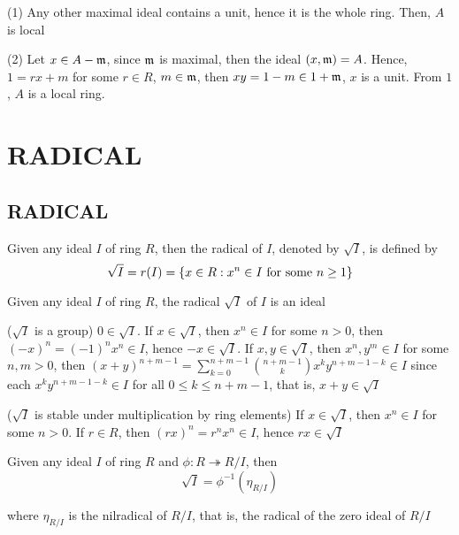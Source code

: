 \begin{longproof}
	(1) Any other maximal ideal contains a unit, hence it is the whole ring. Then, $A$ is local
	
	(2) Let $x \in A - \mathfrak{m}$, since $\mathfrak{m}$ is maximal, then the ideal $(x, \mathfrak{m}) = A$. Hence, $1 = rx + m$ for some $r \in R$, $m \in \mathfrak{m}$, then $xy = 1 - m \in 1 + \mathfrak{m}$, $x$ is a unit. From $1$, $A$ is a local ring. 
\end{longproof}

\section{RADICAL}

\subsection{RADICAL}

\begin{definition}[radical]
	Given any ideal $I$ of ring $R$, then the radical of $I$, denoted by $\sqrt{I}$, is defined by
	$$
		\sqrt{I} = r(I) = \{x \in R: x^n \in I \text{ for some } n \geq 1\}
	$$
\end{definition}

\begin{proposition}
	Given any ideal $I$ of ring $R$, the radical $\sqrt{I}$ of $I$ is an ideal
\end{proposition}

\begin{longproof}
	($\sqrt{I}$ is a group) $0 \in \sqrt{I}$. If $x \in \sqrt{I}$, then $x^n \in I$ for some $n > 0$, then $(-x)^n = (-1)^n x^n \in I$, hence $-x \in \sqrt{I}$. If $x, y \in \sqrt{I}$, then $x^n, y^m \in I$ for some $n, m > 0$, then $(x + y)^{n +m - 1} = \sum_{k = 0}^{n+m-1} {n + m - 1 \choose k} x^k y^{n + m - 1 - k} \in I$ since each $x^k y^{n + m - 1 - k} \in I$ for all $0 \leq k \leq n+m-1$, that is, $x + y \in \sqrt{I}$
	
	($\sqrt{I}$ is stable under multiplication by ring elements) If $x \in \sqrt{I}$, then $x^n \in I$ for some $n > 0$. If $r \in R$, then $(rx)^n = r^n x^n \in I$, hence $rx \in \sqrt{I}$
\end{longproof}

\begin{proposition}
	Given any ideal $I$ of ring $R$ and $\phi: R \twoheadrightarrow R / I$, then
	$$
		\sqrt{I} = \phi^{-1}(\eta_{R/I})
	$$
	
	where $\eta_{R/I}$ is the nilradical of $R/I$, that is, the radical of the zero ideal of $R/I$ 
\end{proposition}

